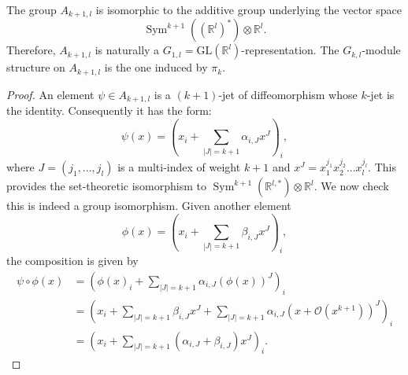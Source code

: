 \documentclass[10pt,a4paper]{amsart}
\DeclareMathOperator{\Sym}{Sym}
\newcommand{\rr}{\mathbb{R}}
\begin{document}
\begin{lemma} \label{modulestructure}
The group $A_{k+1, l}$ is isomorphic to the additive group underlying the vector space 
\[
\Sym^{k+1}((\rr^{l})^*) \otimes \rr^l.
\]
 Therefore, $A_{k+1, l}$ is naturally a $G_{1,l} = \mathrm{GL}(\rr^l)$-representation. The $G_{k,l}$-module structure on $A_{k+1,l}$ is the one induced by $\pi_{k}$. 
\end{lemma}

\begin{proof}
An element $\psi \in A_{k+1,l}$ is a $(k+1)$-jet of diffeomorphism whose $k$-jet is the identity. Consequently it has the form: 
\[
\psi(x) = (x_{i} + \sum_{|J| = k+1} \alpha_{i, J} x^{J} )_{i},
\]
where $J = (j_{1}, ..., j_{l})$ is a multi-index of weight $k +1$ and $x^{J} = x_1^{j_{1}} x_2^{j_{2}} ... x_l^{j_{l}}$. This provides the set-theoretic isomorphism to $\Sym^{k+1}(\rr^{l,*}) \otimes \rr^l$. We now check this is indeed a group isomorphism. Given another element 
\[
\phi(x) = (x_{i} + \sum_{|J| = k+1} \beta_{i, J} x^{J} )_{i},
\]
the composition is given by 
\begin{align*}
\psi \circ \phi(x) &= ( \phi(x)_{i} +  \sum_{|J| = k+1} \alpha_{i, J} (\phi(x))^{J})_{i} \\
&= (x_{i} + \sum_{|J| = k+1} \beta_{i, J} x^{J} +  \sum_{|J| = k+1} \alpha_{i, J} (x + \mathcal{O}(x^{k+1}))^{J})_{i} \\
&= (x_{i} + \sum_{|J| = k+1}( \alpha_{i,J} + \beta_{i, J}) x^{J})_{i}.
\end{align*}


\end{proof}
\end{document}
